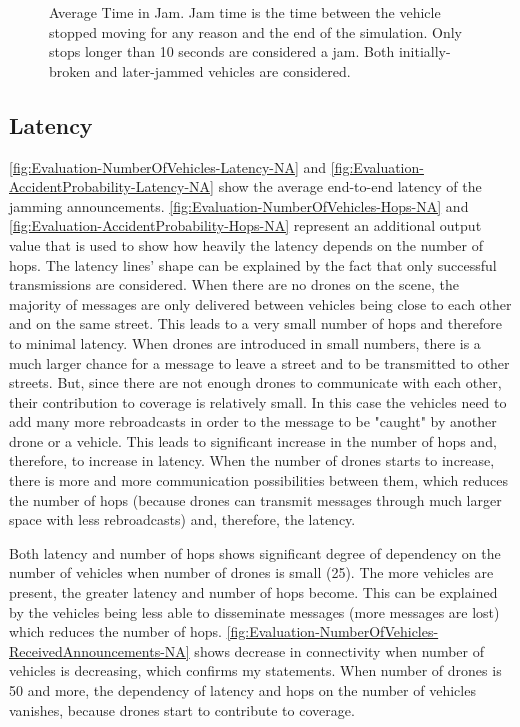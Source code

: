 \documentclass[]{nsm-thesis}
\begin{document}
\begin{figure}%
	\centering
	\hfill
	\hfill
	\caption{Average Time in Jam. Jam time is the time between the vehicle stopped moving for any reason and the end of the simulation. Only stops longer than 10 seconds are considered a jam. Both initially-broken and later-jammed vehicles are considered.}%
	\label{fig:Evaluation-JamTime}%
\end{figure}

\subsection{Latency}

\cref{fig:Evaluation-NumberOfVehicles-Latency-NA} and \cref{fig:Evaluation-AccidentProbability-Latency-NA} show the average end-to-end latency of the jamming announcements. \cref{fig:Evaluation-NumberOfVehicles-Hops-NA} and \cref{fig:Evaluation-AccidentProbability-Hops-NA} represent an additional output value that is used to show how heavily the latency depends on the number of hops. The latency lines' shape can be explained by the fact that only successful transmissions are considered. When there are no drones on the scene, the majority of messages are only delivered between vehicles being close to each other and on the same street. This leads to a very small number of hops and therefore to minimal latency. When drones are introduced in small numbers, there is a much larger chance for a message to leave a street and to be transmitted to other streets. But, since there are not enough drones to communicate with each other, their contribution to coverage is relatively small. In this case the vehicles need to add many more rebroadcasts in order to the message to be "caught" by another drone or a vehicle. This leads to significant increase in the number of hops and, therefore, to increase in latency. When the number of drones starts to increase, there is more and more communication possibilities between them, which reduces the number of hops (because drones can transmit messages through much larger space with less rebroadcasts) and, therefore, the latency.

Both latency and number of hops shows significant degree of dependency on the number of vehicles when number of drones is small (25). The more vehicles are present, the greater latency and number of hops become. This can be explained by the vehicles being less able to disseminate messages (more messages are lost) which reduces the number of hops. \cref{fig:Evaluation-NumberOfVehicles-ReceivedAnnouncements-NA} shows decrease in connectivity when number of vehicles is decreasing, which confirms my statements. When number of drones is 50 and more, the dependency of latency and hops on the number of vehicles vanishes, because drones start to contribute to coverage. 
\end{document}

